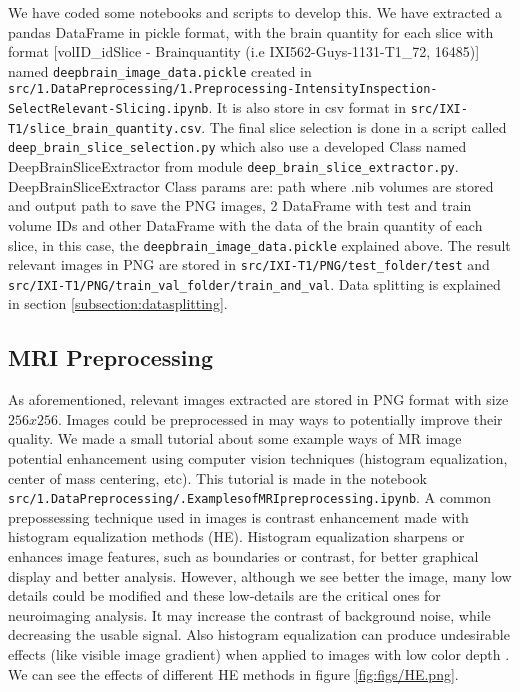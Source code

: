 
We have coded some notebooks and scripts to develop this. We have extracted a pandas DataFrame in pickle format, with the brain quantity for each slice with format [volID\_idSlice - Brainquantity (i.e IXI562-Guys-1131-T1\_72, 16485)] named \texttt{deepbrain\-\_image\-\_data\-.pickle} created in \texttt{src/\-1.DataPreprocessing/\-1.Preprocessing\--IntensityInspection\--Select\-Rel\-evant\--Slicing\-.ipynb}. It is also store in csv format in \texttt{src\-/IXI-T1\-/slice\_\-brain\_\-quantity.csv}.  The final slice selection is done in a script called \texttt{deep\_brain\_slice\_selection.py} which also use a developed Class named DeepBrainSliceExtractor from module \texttt{deep\-\_brain\-\_slice\-\_extractor.py}. DeepBrainSliceExtractor Class params are: path where .nib volumes are stored and output path to save the PNG images, 2 DataFrame with test and train volume IDs and other DataFrame with the data of the brain quantity of each slice, in this case, the \texttt{deepbrain\-\_image\-\_data\-.pickle} explained above. The result relevant images in PNG are stored in \texttt{src\-/IXI\--T1\-/PNG\-/test\_folder\-/test} and \texttt{src\-/IXI\--T1\-/PNG\-/train\-\_val\-\_folder\-/train\-\_and\-\_val}. Data splitting is explained in section \ref{subsection:datasplitting}.

\subsection{MRI Preprocessing}

As aforementioned, relevant images extracted are stored in PNG format with size $256x256$. Images could be preprocessed in may ways  to potentially improve their quality. We made a small tutorial about some example ways of MR image potential enhancement using computer vision techniques (histogram equalization, center of mass centering, etc). This tutorial is made in the notebook  \texttt{src\-/1.\-DataPrep\-roc\-\-essing/.\-Examples\-of\-MRI\-preprocessing\-.ipynb}. A common prepossessing technique used in images is contrast enhancement made with histogram equalization methods (HE). Histogram equalization sharpens or enhances image features, such as boundaries or contrast, for better graphical display and better analysis. However, although we see better the image, many low details could be modified and these low-details are the critical ones for neuroimaging analysis. It may increase the contrast of background noise, while decreasing the usable signal. Also histogram equalization can produce undesirable effects (like visible image gradient) when applied to images with low color depth \cite{histogrameq} \cite{histogrameq2}. We can see the effects of different HE methods in figure \ref{fig:figs/HE.png}.


